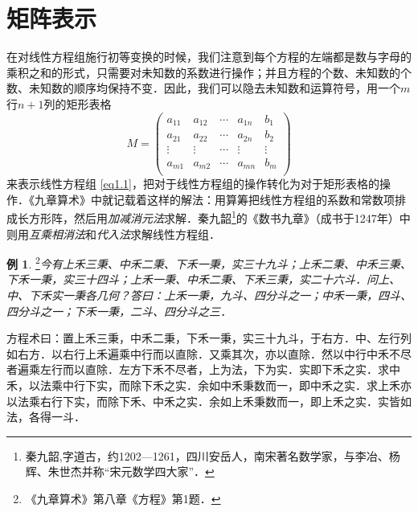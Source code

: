\documentclass[a4paper,fontset=windows]{ctexbook}
\theoremstyle{definition}
\newtheorem{example}{例}[chapter]
\begin{document}
\clearpage\section{矩阵表示}

在对线性方程组施行初等变换的时候，我们注意到每个方程的左端都是数与字母的乘积之和的形式，只需要对未知数的系数进行操作；并且方程的个数、未知数的个数、未知数的顺序均保持不变．因此，我们可以隐去未知数和运算符号，用一个$m$行$n+1$列的矩形表格
\begin{equation}\label{eq1.3}
M=\begin{pmatrix}
a_{11}&a_{12}&\cdots&a_{1n}&b_1 \\
a_{21}&a_{22}&\cdots&a_{2n}&b_2 \\
\vdots&\vdots&\cdots&\vdots&\vdots \\
a_{m1}&a_{m2}&\cdots&a_{mn}&b_m \\
\end{pmatrix}
\end{equation}
来表示线性方程组 \eqref{eq1.1}，把对于线性方程组的操作转化为对于矩形表格的操作．《九章算术》中就记载着这样的解法：用算筹把线性方程组的系数和常数项排成长方形阵，然后用{\em 加减消元法}求解．秦九韶\footnote{秦九韶,字道古，约1202—1261，四川安岳人，南宋著名数学家，与李冶、杨辉、朱世杰并称“宋元数学四大家”．}的《数书九章》（成书于1247年）中则用{\em 互乘相消法}和{\em 代入法}求解线性方程组．

\begin{example}\label{ex1.2}
\footnote{《九章算术》第八章《方程》第1题．}\em 今有上禾三秉、中禾二秉、下禾一秉，实三十九斗；上禾二秉、中禾三秉、下禾一秉，实三十四斗；上禾一秉、中禾二秉、下禾三秉，实二十六斗．问上、中、下禾实一秉各几何？答曰：上禾一秉，九斗、四分斗之一；中禾一秉，四斗、四分斗之一；下禾一秉，二斗、四分斗之三．

方程术曰：置上禾三秉，中禾二秉，下禾一秉，实三十九斗，于右方．中、左行列如右方．以右行上禾遍乘中行而以直除．又乘其次，亦以直除．然以中行中禾不尽者遍乘左行而以直除．左方下禾不尽者，上为法，下为实．实即下禾之实．求中禾，以法乘中行下实，而除下禾之实．余如中禾秉数而一，即中禾之实．求上禾亦以法乘右行下实，而除下禾、中禾之实．余如上禾秉数而一，即上禾之实．实皆如法，各得一斗．
\end{example}
\end{document}
